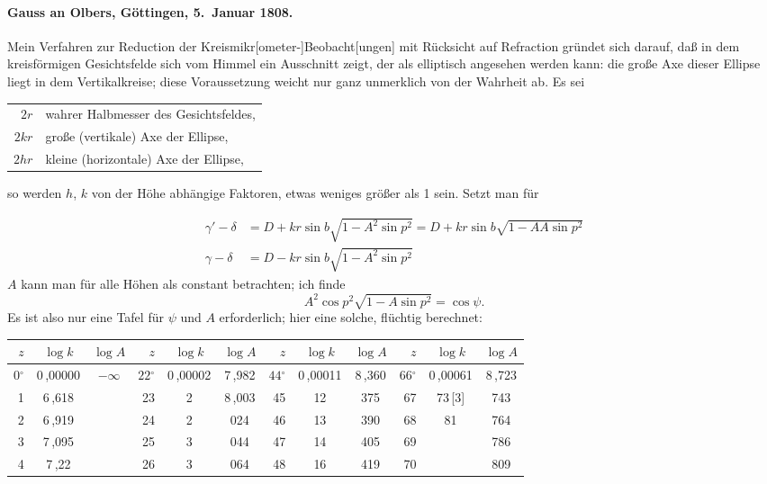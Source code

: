 \documentclass[12pt,a4paper]{article}
\newcommand{\degree}{\ensuremath{^\circ}}
\theoremstyle{plain}
\theoremstyle{definition}
\theoremstyle{remark}
\begin{document}
\paragraph{Gauss an Olbers, Göttingen, 5.~Januar 1808.}

Mein Verfahren zur Reduction der Kreismikr[ometer-]Beobacht[ungen] mit Rücksicht auf Refraction gründet sich darauf, daß in dem kreisförmigen Gesichtsfelde sich vom Himmel ein Ausschnitt zeigt, der als elliptisch angesehen werden kann: die große Axe dieser Ellipse liegt in dem Vertikalkreise; diese Voraussetzung weicht nur ganz unmerklich von der Wahrheit ab. Es sei

\begin{center}
\begin{tabular}{rl}
$2r$ & wahrer Halbmesser des Gesichtsfeldes, \\
$2kr$ & große (vertikale) Axe der Ellipse, \\
$2hr$ & kleine (horizontale) Axe der Ellipse,
\end{tabular}
\end{center}

so werden $h$, $k$ von der Höhe abhängige Faktoren, etwas weniges größer als 1 sein. Setzt man für

\begin{align*}
\gamma' - \delta &= D + kr\sin b\sqrt{1 - A^2\sin p^2} = D + kr\sin b\sqrt{1 - AA\sin p^2}\\
\gamma - \delta &= D - kr\sin b\sqrt{1 - A^2\sin p^2}
\end{align*}
$A$ kann man für alle Höhen als constant betrachten; ich finde
\[
A^2\cos p^2 \sqrt{1 - A\sin p^2} = \cos\psi.
\]
Es ist also nur eine Tafel für $\psi$ und $A$ erforderlich; hier eine solche, flüchtig berechnet:

\begin{center}
\small
\begin{tabular}{r|cc||r|cc||r|cc||r|cc}
$z$ & $\log k$ & $\log A$ & $z$ & $\log k$ & $\log A$ & $z$ & $\log k$ & $\log A$ & $z$ & $\log k$ & $\log A$ \\
\hline
$0\degree$ & 0\,,00000 & $-\infty$ & $22\degree$ & 0\,,00002 & 7\,,982 & $44\degree$ & 0\,,00011 & 8\,,360 & $66\degree$ & 0\,,00061 & 8\,,723 \\
1 & 6\,,618 & & 23 & 2 & 8\,,003 & 45 & 12 & 375 & 67 & 73\,[3] & 743 \\
2 & 6\,,919 & & 24 & 2 & 024 & 46 & 13 & 390 & 68 & 81 & 764 \\
3 & 7\,,095 & & 25 & 3 & 044 & 47 & 14 & 405 & 69 & & 786 \\
4 & 7\,,22 & & 26 & 3 & 064 & 48 & 16 & 419 & 70 & & 809
\end{tabular}
\end{center}
\end{document}
